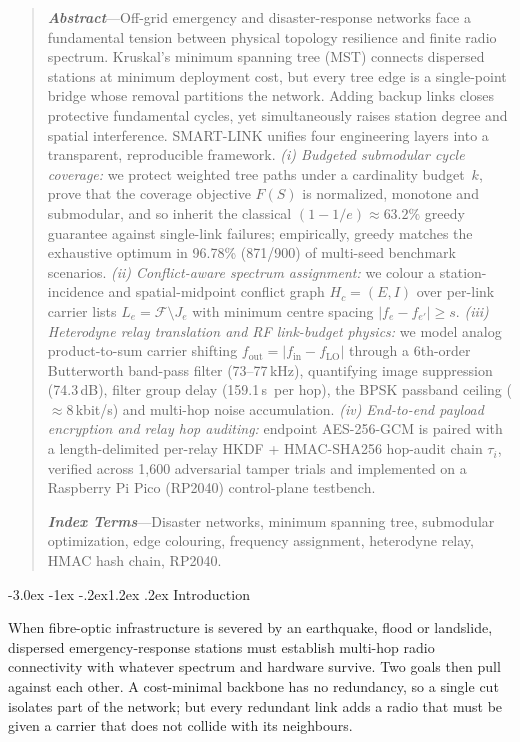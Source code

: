 \documentclass[10pt,a4paper]{article}
\makeatletter
\renewcommand\section{\@startsection{section}{1}{\z@}%
  {-3.0ex \@plus -1ex \@minus -.2ex}{1.2ex \@plus .2ex}%
  {\normalfont\large\bfseries}}
\newcommand\kHz{\,kHz}
\newcommand\us{\,\textmu s}
\makeatother
\begin{document}
\begin{quote}
\small
\noindent\textbf{\textit{Abstract}}---Off-grid emergency and disaster-response networks face a fundamental tension between physical topology
resilience and finite radio spectrum. Kruskal's minimum spanning tree (MST) connects dispersed stations at
minimum deployment cost, but every tree edge is a single-point bridge whose removal partitions the network.
Adding backup links closes protective fundamental cycles, yet simultaneously raises station degree and spatial
interference. SMART-LINK unifies four engineering layers into a transparent, reproducible framework.
\emph{(i) Budgeted submodular cycle coverage:} we protect weighted tree paths under a cardinality budget~$k$,
prove that the coverage objective $F(S)$ is normalized, monotone and submodular, and so inherit the classical
$(1-1/e)\approx 63.2\%$ greedy guarantee against single-link failures; empirically, greedy matches the exhaustive
optimum in 96.78\% (871/900) of multi-seed benchmark scenarios. \emph{(ii) Conflict-aware spectrum
assignment:} we colour a station-incidence and spatial-midpoint conflict graph $H_c=(E,I)$ over per-link carrier
lists $L_e=\mathcal F\setminus J_e$ with minimum centre spacing $|f_e-f_{e'}|\ge s$. \emph{(iii) Heterodyne relay
translation and RF link-budget physics:} we model analog product-to-sum carrier shifting $f_\text{out}=|f_\text{in}-f_\text{LO}|$
through a 6th-order Butterworth band-pass filter (73--77\kHz), quantifying image suppression (74.3\,dB), filter group
delay (159.1\us\ per hop), the BPSK passband ceiling ($\approx$8\,kbit/s) and multi-hop noise accumulation.
\emph{(iv) End-to-end payload encryption and relay hop auditing:} endpoint AES-256-GCM is paired with a
length-delimited per-relay HKDF + HMAC-SHA256 hop-audit chain $\tau_i$, verified across 1{,}600 adversarial tamper
trials and implemented on a Raspberry Pi Pico (RP2040) control-plane testbench.

\smallskip
\noindent\textbf{\textit{Index Terms}}---Disaster networks, minimum spanning tree, submodular optimization, edge colouring,
frequency assignment, heterodyne relay, HMAC hash chain, RP2040.
\end{quote}

\section{Introduction}\label{sec:intro}

When fibre-optic infrastructure is severed by an earthquake, flood or landslide, dispersed emergency-response
stations must establish multi-hop radio connectivity with whatever spectrum and hardware survive. Two goals then
pull against each other. A cost-minimal backbone has no redundancy, so a single cut isolates part of the network;
but every redundant link adds a radio that must be given a carrier that does not collide with its neighbours.
\end{document}

